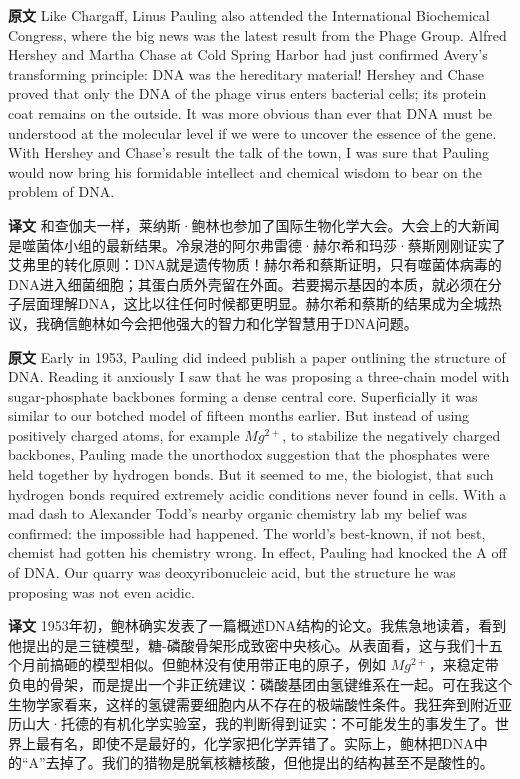 \documentclass[UTF8,zihao=-4]{ctexart}
\newcommand{\BodyFont}{\fontsize{10.5pt}{15.5pt}\selectfont}
\renewenvironment{quote}{\par\noindent\begingroup\BodyFont}{\par\endgroup}
\begin{document}
\begin{quote}
\noindent\textbf{原文} Like Chargaff, Linus Pauling also attended the International Biochemical Congress, where the big news was the latest result from the Phage Group. Alfred Hershey and Martha Chase at Cold Spring Harbor had just confirmed Avery's transforming principle: DNA was the hereditary material! Hershey and Chase proved that only the DNA of the phage virus enters bacterial cells; its protein coat remains on the outside. It was more obvious than ever that DNA must be understood at the molecular level if we were to uncover the essence of the gene. With Hershey and Chase's result the talk of the town, I was sure that Pauling would now bring his formidable intellect and chemical wisdom to bear on the problem of DNA.

\smallskip
\noindent\textbf{译文} 和查伽夫一样，莱纳斯·鲍林也参加了国际生物化学大会。大会上的大新闻是噬菌体小组的最新结果。冷泉港的阿尔弗雷德·赫尔希和玛莎·蔡斯刚刚证实了艾弗里的转化原则：DNA就是遗传物质！赫尔希和蔡斯证明，只有噬菌体病毒的DNA进入细菌细胞；其蛋白质外壳留在外面。若要揭示基因的本质，就必须在分子层面理解DNA，这比以往任何时候都更明显。赫尔希和蔡斯的结果成为全城热议，我确信鲍林如今会把他强大的智力和化学智慧用于DNA问题。
\end{quote}

\begin{quote}
\noindent\textbf{原文} Early in 1953, Pauling did indeed publish a paper outlining the structure of DNA. Reading it anxiously I saw that he was proposing a three-chain model with sugar-phosphate backbones forming a dense central core. Superficially it was similar to our botched model of fifteen months earlier. But instead of using positively charged atoms, for example \(Mg^{2+}\), to stabilize the negatively charged backbones, Pauling made the unorthodox suggestion that the phosphates were held together by hydrogen bonds. But it seemed to me, the biologist, that such hydrogen bonds required extremely acidic conditions never found in cells. With a mad dash to Alexander Todd's nearby organic chemistry lab my belief was confirmed: the impossible had happened. The world's best-known, if not best, chemist had gotten his chemistry wrong. In effect, Pauling had knocked the A off of DNA. Our quarry was deoxyribonucleic acid, but the structure he was proposing was not even acidic.

\smallskip
\noindent\textbf{译文} 1953年初，鲍林确实发表了一篇概述DNA结构的论文。我焦急地读着，看到他提出的是三链模型，糖-磷酸骨架形成致密中央核心。从表面看，这与我们十五个月前搞砸的模型相似。但鲍林没有使用带正电的原子，例如 \(Mg^{2+}\)，来稳定带负电的骨架，而是提出一个非正统建议：磷酸基团由氢键维系在一起。可在我这个生物学家看来，这样的氢键需要细胞内从不存在的极端酸性条件。我狂奔到附近亚历山大·托德的有机化学实验室，我的判断得到证实：不可能发生的事发生了。世界上最有名，即使不是最好的，化学家把化学弄错了。实际上，鲍林把DNA中的“A”去掉了。我们的猎物是脱氧核糖核酸，但他提出的结构甚至不是酸性的。
\end{quote}
\end{document}
